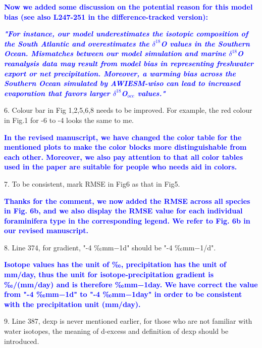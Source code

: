 \documentclass[gmd, manuscript]{copernicus}
\begin{document}
\medskip

\textcolor{blue}{\textbf{Now we added some discussion on the potential reason for this model bias (see also L247-251 in the difference-tracked version):}}

\textcolor{blue}{\textbf{\textit{"For instance, our model underestimates the  isotopic composition  of the South Atlantic and overestimates the $\delta^{18}$O values in the Southern Ocean. Mismatches between our model simulation and marine $\delta^{18}$O reanalysis data may result from model bias in representing freshwater export or net precipitation. Moreover, a warming bias across the Southern Ocean simulated by AWIESM-wiso  can lead to increased evaporation that favors larger $\delta^{18}$O$_{oce}$ values."}}}

\medskip



6. Colour bar in Fig 1,2,5,6,8 needs to be improved. For example, the red colour in Fig.1 for -6 to -4 looks the same to me.

\medskip

\textcolor{blue}{\textbf{In the revised manuscript, we have changed the color table for the mentioned plots to make the color blocks more distinguishable from each other. Moreover, we also pay attention to that all color tables used in the paper are suitable for people who needs aid in colors.}}

\medskip

7. To be consistent, mark RMSE in Fig6 as that in Fig5.

\medskip

\textcolor{blue}{\textbf{Thanks for the comment, we now added the RMSE across all species in Fig. 6b, and we also display the RMSE value for each individual foraminifera type in the corresponding legend. We refer to   Fig. 6b in our revised manuscript.}}

\medskip

8. Line 374, for gradient, "-4 ‰mm−1d" should be "-4 ‰mm−1/d".

\medskip


\textcolor{blue}{\textbf{Isotope values has the unit of ‰, precipitation has the unit of mm/day, thus the unit for isotope-precipitation gradient is ‰/(mm/day) and is therefore ‰mm−1day. We have correct the value from "-4 ‰mm−1d" to "-4 ‰mm−1day" in order to be consistent with the precipitation unit (mm/day).}}

\medskip


9. Line 387, dexp is never mentioned earlier, for those who are not familiar with water isotopes, the meaning of d-excess and definition of dexp should be introduced.
\end{document}
